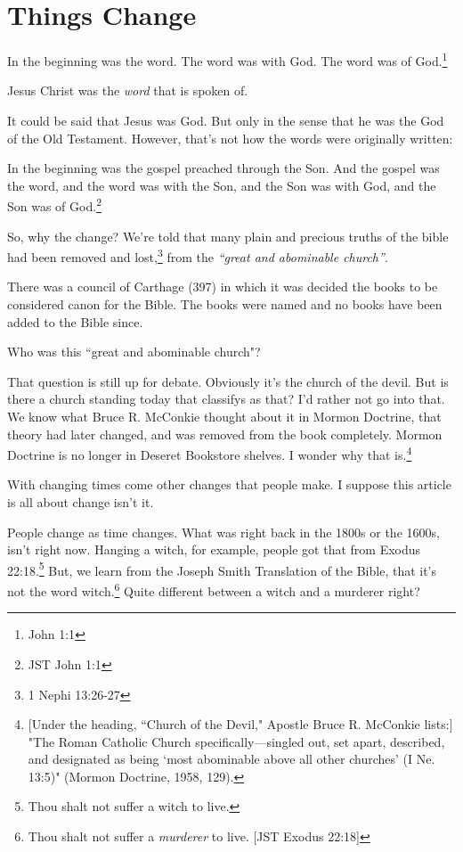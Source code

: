 \chapter{Things Change}

\begin{displayquote}
In the beginning was the word. The word was with God. The word was of 
God.\footnote{John 1:1} 
\end{displayquote}

Jesus Christ was the \textit{word} that is spoken of.

It could be said that Jesus was God. But only in the sense that he was the 
God of the Old Testament.\cite{otStudentManual} However, that's not how the
words were originally written:

\begin{displayquote}
In the beginning was the gospel preached through the Son. And the gospel was 
the word, and the word was with the Son, and the Son was with God, and the Son 
was of God.\footnote{JST John 1:1}
\end{displayquote}

So, why the change? We're told that many plain and precious truths of the bible 
had been removed and lost,\footnote{1 Nephi 13:26-27} from the \textit{``great 
and abominable church''}.

There was a council of Carthage (397) in which it was decided the books to
be considered canon for the Bible. The books were named and no books have
been added to the Bible since.

Who was this ``great and abominable church"?

That question is still up for debate. Obviously it's the church of the devil. 
But is there a church standing today that classifys as that? I'd rather not 
go into that. We know what Bruce R. McConkie thought about it in Mormon 
Doctrine, that theory had later changed, and was removed from the book 
completely. Mormon Doctrine is no longer in Deseret Bookstore shelves. I wonder 
why that is.\footnote{[Under the heading, ``Church of the Devil," Apostle Bruce 
R. McConkie lists:] "The Roman Catholic Church specifically—singled out, set 
apart, described, and designated as being ‘most abominable above all other 
churches' (I Ne. 13:5)" (Mormon Doctrine, 1958, 129).}

With changing times come other changes that people make. I suppose this article 
is all about change isn't it.

People change as time changes. What was right back in the 1800s or the 1600s, 
isn't right now. Hanging a witch, for example, people got that from Exodus 
22:18.\footnote{Thou shalt not suffer a witch to live.} But, we learn from the 
Joseph Smith Translation of the Bible, that it's not the word 
witch.\footnote{Thou shalt not suffer a \textit{murderer} to live. 
[JST Exodus 22:18]} Quite different between a witch and a murderer right?

